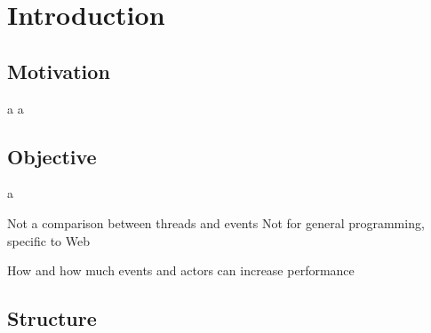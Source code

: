 \chapter{Introduction}

\section{Motivation} \newpage a \newpage a

\section{Objective} \newpage a

Not a comparison between threads and events
Not for general programming, specific to Web

How and how much events and actors can increase performance


\section{Structure}